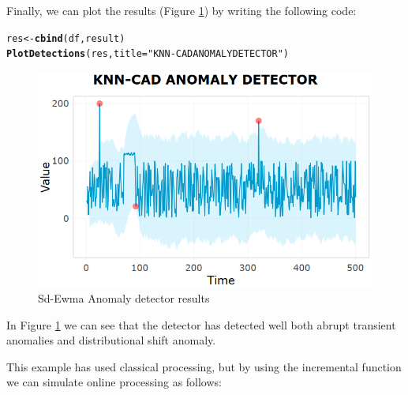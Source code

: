 \documentclass[a4paper]{article}\usepackage[]{graphicx}\usepackage[]{color}
\makeatletter
\newcommand{\hlstr}[1]{\textcolor[rgb]{0.192,0.494,0.8}{#1}}%
\newcommand{\hlstd}[1]{\textcolor[rgb]{0.345,0.345,0.345}{#1}}%
\newcommand{\hlkwb}[1]{\textcolor[rgb]{0.69,0.353,0.396}{#1}}%
\newcommand{\hlkwc}[1]{\textcolor[rgb]{0.333,0.667,0.333}{#1}}%
\newcommand{\hlkwd}[1]{\textcolor[rgb]{0.737,0.353,0.396}{\textbf{#1}}}%
\newenvironment{kframe}{%
 \def\at@end@of@kframe{}%
 \ifinner\ifhmode%
  \def\at@end@of@kframe{\end{minipage}}%
  \begin{minipage}{\columnwidth}%
 \fi\fi%
 \def\FrameCommand##1{\hskip\@totalleftmargin \hskip-\fboxsep
 \colorbox{shadecolor}{##1}\hskip-\fboxsep
     \hskip-\linewidth \hskip-\@totalleftmargin \hskip\columnwidth}%
 \MakeFramed {\advance\hsize-\width
   \@totalleftmargin\z@ \linewidth\hsize
   \@setminipage}}%
 {\par\unskip\endMakeFramed%
 \at@end@of@kframe}
\newenvironment{knitrout}{}{} %
\makeatother
\begin{document}
Finally, we can plot the results (Figure \ref{fig:result}) by writing the following code:

\begin{knitrout}
\color{fgcolor}\begin{kframe}
\begin{alltt}
\hlstd{res} \hlkwb{<-} \hlkwd{cbind}\hlstd{(df, result)}
\hlkwd{PlotDetections}\hlstd{(res,} \hlkwc{title} \hlstd{=} \hlstr{"KNN-CAD ANOMALY DETECTOR"}\hlstd{)}
\end{alltt}
\end{kframe}
\end{knitrout}

\begin{figure}[htbp]
\centering
\includegraphics[width=0.5\linewidth]{sdEwmaresult.PNG}
\caption{Sd-Ewma Anomaly detector results}
\label{fig:result}
\end{figure}

In Figure \ref{fig:result} we can see that the detector has detected well both abrupt transient anomalies  and distributional shift anomaly.

This example has used classical processing, but by using the incremental function we can simulate online processing as follows:
\end{document}
